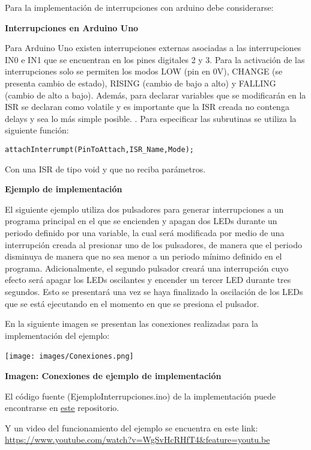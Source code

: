 \documentclass[a4paper,11pt]{article}
\begin{document}
Para la implementación de interrupciones con arduino debe considerarse:

{\large\bfseries Interrupciones en Arduino Uno} 

Para Arduino Uno existen interrupciones externas asociadas a las interrupciones IN0 e IN1 que se encuentran en los pines digitales 2 y 3. Para la activación de las interrupciones solo se permiten los modos LOW (pin en 0V), CHANGE (se presenta cambio de estado), RISING (cambio de bajo a alto) y FALLING (cambio de alto a bajo). Además, para declarar variables que se modificarán en la ISR se declaran como volatile y es importante que la ISR creada no contenga delays y sea lo más simple posible. \cite[p.11-14]{reyes2015arduino}.
Para especificar las subrutinas se utiliza la siguiente función:
\begin{verbatim}attachInterrumpt(PinToAttach,ISR_Name,Mode);\end{verbatim}
Con una ISR de tipo void y que no reciba parámetros.

{\large\bfseries Ejemplo de implementación} 

El siguiente ejemplo utiliza dos pulsadores para generar interrupciones a un programa principal en el que se encienden y apagan dos LEDs durante un periodo definido por una variable, la cual será modificada por medio de una interrupción creada al presionar uno de los pulsadores, de manera que el periodo disminuya de manera que no sea menor a un periodo mínimo definido en el programa.
Adicionalmente, el segundo pulsador creará una interrupción cuyo efecto será apagar los LEDs oscilantes y encender un tercer LED durante tres segundos. Esto se presentará una vez se haya finalizado la oscilación de los LEDs que se está ejecutando en el momento en que se presiona el pulsador.

En la siguiente imagen se presentan las conexiones realizadas para la implementación del ejemplo:

\texttt{[image: images/Conexiones.png]}~

{\large\bfseries Imagen: Conexiones de ejemplo de implementación}

El código fuente (EjemploInterrupciones.ino) de la implementación puede encontrarse en \href{https://github.com/AndreaOspinaHincapie/Informatica2/tree/master/Proyectos%20de%20investigaci%C3%B3n/Interrupciones}{\underline {este}} repositorio.

Y un video del funcionamiento del ejemplo se encuentra en este link:  \url{https://www.youtube.com/watch?v=WgSvHcRHfT4&feature=youtu.be}


\newpage

\renewcommand\refname{REFERENCIAS BIBLIOGRÁFICAS}
%


\end{document}
